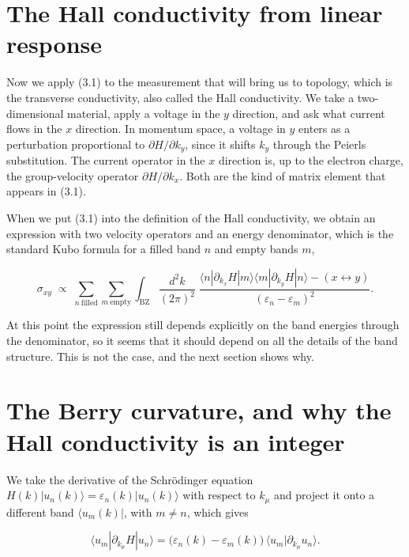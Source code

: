 \section{The Hall conductivity from linear response}

Now we apply (3.1) to the measurement that will bring us to topology, which is the transverse
conductivity, also called the Hall conductivity. We take a two-dimensional material, apply a voltage
in the $y$ direction, and ask what current flows in the $x$ direction. In momentum space, a voltage in
$y$ enters as a perturbation proportional to $\partial H/\partial k_y$, since it shifts $k_y$ through
the Peierls substitution. The current operator in the $x$ direction is, up to the electron charge,
the group-velocity operator $\partial H/\partial k_x$. Both are the kind of matrix element that
appears in (3.1).

When we put (3.1) into the definition of the Hall conductivity, we obtain an expression with two
velocity operators and an energy denominator, which is the standard Kubo formula for a filled band
$n$ and empty bands $m$,

\begin{equation}
\sigma_{xy} \;\propto\; \sum_{n\ \text{filled}} \sum_{m\ \text{empty}} \int_{\text{BZ}}
\frac{d^2k}{(2\pi)^2}\;
\frac{\langle n|\partial_{k_x}H|m\rangle\langle m|\partial_{k_y}H|n\rangle - (x\leftrightarrow y)}
{(\varepsilon_n - \varepsilon_m)^2}.
\end{equation}

At this point the expression still depends explicitly on the band energies through the denominator,
so it seems that it should depend on all the details of the band structure. This is not the case,
and the next section shows why.

\section{The Berry curvature, and why the Hall conductivity is an integer}

We take the derivative of the Schrödinger equation $H(k)|u_n(k)\rangle = \varepsilon_n(k)|u_n(k)\rangle$
with respect to $k_\mu$ and project it onto a different band $\langle u_m(k)|$, with $m \neq n$, which
gives

\begin{equation}
\langle u_m|\partial_{k_\mu} H|u_n\rangle
= \big(\varepsilon_n(k) - \varepsilon_m(k)\big)\,\langle u_m|\partial_{k_\mu} u_n\rangle.
\end{equation}


